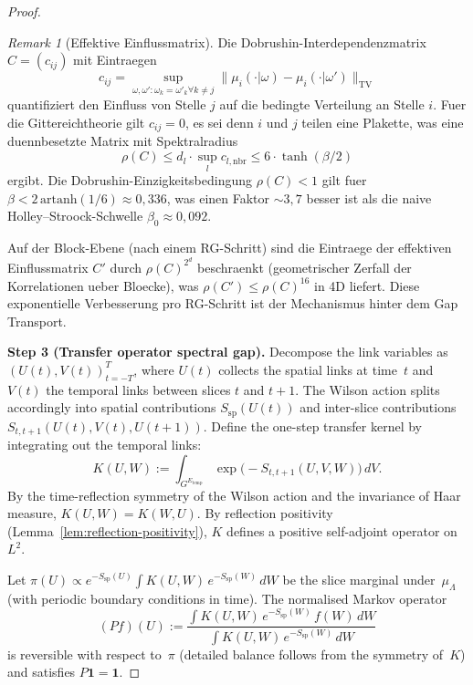 \documentclass[12pt,a4paper]{article}
\theoremstyle{definition}
\theoremstyle{plain}
\theoremstyle{remark}
\newtheorem{remark}[definition]{Remark}
\begin{document}
\begin{proof}
\begin{remark}[Effektive Einflussmatrix]
\label{rem:influence-matrix}
Die Dobrushin-Interdependenzmatrix $C = (c_{ij})$ mit Eintraegen
\[
c_{ij} = \sup_{\omega, \omega': \omega_k = \omega'_k \forall k \neq j} \| \mu_i(\cdot | \omega) - \mu_i(\cdot | \omega') \|_{\mathrm{TV}}
\]
quantifiziert den Einfluss von Stelle $j$ auf die bedingte Verteilung an Stelle $i$. Fuer die Gittereichtheorie gilt $c_{ij} = 0$, es sei denn $i$ und $j$ teilen eine Plakette, was eine duennbesetzte Matrix mit Spektralradius
\[
\rho(C) \leq d_l \cdot \sup_{l} c_{l, \mathrm{nbr}} \leq 6 \cdot \tanh(\beta/2)
\]
ergibt. Die Dobrushin-Einzigkeitsbedingung $\rho(C) < 1$ gilt fuer $\beta < 2\,\mathrm{artanh}(1/6) \approx 0{,}336$, was einen Faktor $\sim 3{,}7$ besser ist als die naive Holley--Stroock-Schwelle $\beta_0 \approx 0{,}092$.

Auf der Block-Ebene (nach einem RG-Schritt) sind die Eintraege der effektiven Einflussmatrix $C'$ durch $\rho(C)^{2^d}$ beschraenkt (geometrischer Zerfall der Korrelationen ueber Bloecke), was $\rho(C') \leq \rho(C)^{16}$ in 4D liefert. Diese exponentielle Verbesserung pro RG-Schritt ist der Mechanismus hinter dem Gap Transport.
\end{remark}

\medskip
\noindent\textbf{Step 3 (Transfer operator spectral gap).}
Decompose the link variables as $(U(t), V(t))_{t=-T}^T$, where $U(t)$ collects the spatial links at time~$t$ and $V(t)$ the temporal links between slices $t$ and $t+1$. The Wilson action splits accordingly into spatial contributions $S_{\mathrm{sp}}(U(t))$ and inter-slice contributions $S_{t,t+1}(U(t), V(t), U(t+1))$. Define the one-step transfer kernel by integrating out the temporal links:
\begin{equation}\label{eq:transfer-kernel}
    K(U, W) := \int_{G^{E_{\mathrm{temp}}}} \exp\!\bigl(-S_{t,t+1}(U, V, W)\bigr)\,dV.
\end{equation}
By the time-reflection symmetry of the Wilson action and the invariance of Haar measure, $K(U,W) = K(W,U)$. By reflection positivity (Lemma~\ref{lem:reflection-positivity}), $K$ defines a positive self-adjoint operator on $L^2$.

Let $\pi(U) \propto e^{-S_{\mathrm{sp}}(U)}\int K(U,W)\,e^{-S_{\mathrm{sp}}(W)}\,dW$ be the slice marginal under~$\mu_\Lambda$ (with periodic boundary conditions in time). The normalised Markov operator
\begin{equation}
    (Pf)(U) := \frac{\int K(U,W)\,e^{-S_{\mathrm{sp}}(W)}\,f(W)\,dW}{\int K(U,W)\,e^{-S_{\mathrm{sp}}(W)}\,dW}
\end{equation}
is reversible with respect to~$\pi$ (detailed balance follows from the symmetry of~$K$) and satisfies $P\mathbf{1} = \mathbf{1}$.


\end{proof}
\end{document}
